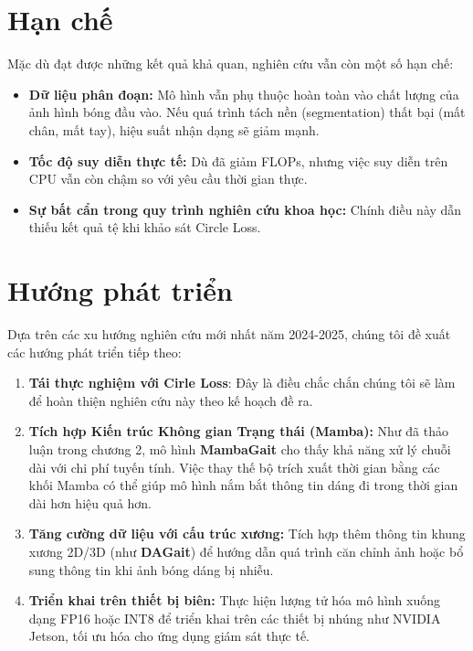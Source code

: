 \section{Hạn chế}

Mặc dù đạt được những kết quả khả quan, nghiên cứu vẫn còn một số hạn chế:
\begin{itemize}
      \item \textbf{Dữ liệu phân đoạn:} Mô hình vẫn phụ thuộc hoàn toàn vào chất lượng của ảnh hình bóng đầu vào. Nếu quá trình tách nền (segmentation) thất bại (mất chân, mất tay), hiệu suất nhận dạng sẽ giảm mạnh.
      \item \textbf{Tốc độ suy diễn thực tế:} Dù đã giảm FLOPs, nhưng việc suy diễn trên CPU vẫn còn chậm so với yêu cầu thời gian thực.
      \item \textbf{Sự bất cẩn trong quy trình nghiên cứu khoa học:} Chính điều này dẫn thiếu kết quả tệ khi khảo sát Circle Loss.
\end{itemize}

\section{Hướng phát triển}

Dựa trên các xu hướng nghiên cứu mới nhất năm 2024-2025, chúng tôi đề xuất các hướng phát triển tiếp theo:

\begin{enumerate}
      \item \textbf{Tái thực nghiệm với Cirle Loss}: Đây là điều chắc chắn chúng tôi sẽ làm để hoàn thiện nghiên cứu này theo kế hoạch đề ra.
      \item \textbf{Tích hợp Kiến trúc Không gian Trạng thái (Mamba):}
            Như đã thảo luận trong chương 2, mô hình \textbf{MambaGait} cho thấy khả năng xử lý chuỗi dài với chi phí tuyến tính. Việc thay thế bộ trích xuất thời gian bằng các khối Mamba có thể giúp mô hình nắm bắt thông tin dáng đi trong thời gian dài hơn hiệu quả hơn.

      \item \textbf{Tăng cường dữ liệu với cấu trúc xương:}
            Tích hợp thêm thông tin khung xương 2D/3D (như \textbf{DAGait}) để hướng dẫn quá trình căn chỉnh ảnh hoặc bổ sung thông tin khi ảnh bóng dáng bị nhiễu.
      \item \textbf{Triển khai trên thiết bị biên:}
            Thực hiện lượng tử hóa mô hình xuống dạng FP16 hoặc INT8 để triển khai trên các thiết bị nhúng như NVIDIA Jetson, tối ưu hóa cho ứng dụng giám sát thực tế.
\end{enumerate}
